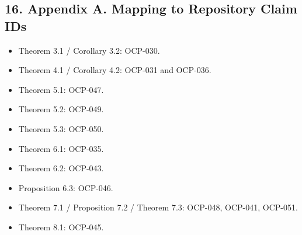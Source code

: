 \documentclass[11pt]{article}
\begin{document}
\subsection*{16. Appendix A. Mapping to Repository Claim IDs}
\begin{itemize}
\item Theorem 3.1 / Corollary 3.2: OCP-030.
\item Theorem 4.1 / Corollary 4.2: OCP-031 and OCP-036.
\item Theorem 5.1: OCP-047.
\item Theorem 5.2: OCP-049.
\item Theorem 5.3: OCP-050.
\item Theorem 6.1: OCP-035.
\item Theorem 6.2: OCP-043.
\item Proposition 6.3: OCP-046.
\item Theorem 7.1 / Proposition 7.2 / Theorem 7.3: OCP-048, OCP-041, OCP-051.
\item Theorem 8.1: OCP-045.
\end{itemize}
\end{document}
